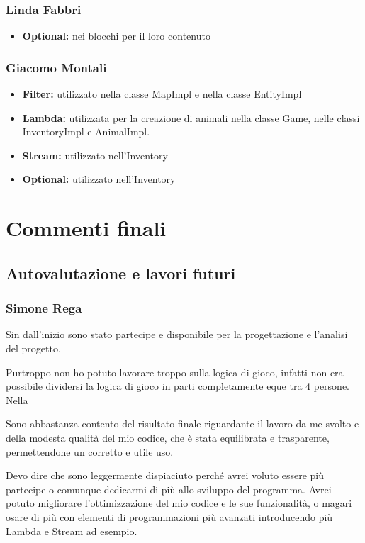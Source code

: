 \documentclass[a4paper,12pt]{report}
\begin{document}
\subsection{Linda Fabbri}

\begin{itemize}
	\item \textbf{Optional: } nei blocchi per il loro contenuto
\end{itemize}


\subsection{Giacomo Montali}

\begin{itemize}
	\item \textbf{Filter:} utilizzato nella classe MapImpl e nella classe EntityImpl
	\item \textbf{Lambda:} utilizzata per la creazione di animali nella classe Game, nelle classi InventoryImpl e AnimalImpl.
	\item \textbf{Stream:} utilizzato nell’Inventory
	\item \textbf{Optional:} utilizzato nell’Inventory
\end{itemize}

\chapter{Commenti finali}


\section{Autovalutazione e lavori futuri}

\subsection{Simone Rega}
Sin dall'inizio sono stato partecipe e disponibile per la progettazione e l'analisi del progetto. 

Purtroppo non ho potuto lavorare troppo sulla logica di gioco, infatti non era possibile dividersi la logica di gioco in parti completamente eque tra 4 persone. 
Nella 

Sono abbastanza contento del risultato finale riguardante il lavoro da me svolto e della modesta qualità del mio codice, che è stata equilibrata e trasparente, permettendone un corretto e utile uso.

Devo dire che sono leggermente dispiaciuto perché avrei voluto essere più partecipe o comunque dedicarmi di più allo sviluppo del programma. Avrei potuto migliorare l'ottimizzazione del mio codice e le sue funzionalità, o magari osare di più con elementi di programmazioni più avanzati introducendo più Lambda e Stream ad esempio. 
\end{document}
